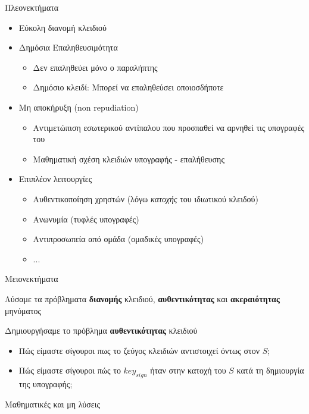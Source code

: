 \documentclass{beamer}
\begin{document}
\begin{frame}{Πλεονεκτήματα}
 
\begin{itemize}
\item Εύκολη διανομή κλειδιού
\pause
\item Δημόσια Επαληθευσιμότητα
\begin{itemize}
\item Δεν επαληθεύει μόνο ο παραλήπτης
\item Δημόσιο κλειδί: Μπορεί να επαληθεύσει οποιοσδήποτε
\end{itemize}
\pause
\item Μη αποκήρυξη (non repudiation)
\begin{itemize}
\item Αντιμετώπιση εσωτερικού αντίπαλου που προσπαθεί να αρνηθεί τις υπογραφές του
\item Μαθηματική σχέση κλειδιών υπογραφής - επαλήθευσης
\end{itemize}
\pause
\item Επιπλέον λειτουργίες
\begin{itemize}
    \item Αυθεντικοποίηση χρηστών (λόγω \emph{κατοχής} του ιδιωτικού κλειδού)
    \pause
    \item Ανωνυμία (τυφλές υπογραφές)
    \pause
    \item Αντιπροσωπεία από ομάδα (ομαδικές υπογραφές)
    \item ...
\end{itemize}
\end{itemize}
\end{frame}

\begin{frame}{Μειονεκτήματα}

Λύσαμε τα πρόβληματα \textbf{διανομής} κλειδιού, \textbf{αυθεντικότητας} και \textbf{ακεραιότητας} μηνύματος

Δημιουργήσαμε το πρόβλημα \textbf{αυθεντικότητας} κλειδιού

\begin{itemize}
\item \alert{Πώς είμαστε σίγουροι πως το ζεύγος κλειδιών αντιστοιχεί όντως στον $S$;}
\pause
\item \alert{Πώς είμαστε σίγουροι πώς το $key_{sign}$ ήταν στην κατοχή του $S$ κατά τη δημιουργία της υπογραφής;}
\end{itemize}
 
\pause Μαθηματικές και μη λύσεις
\end{frame}
\end{document}
